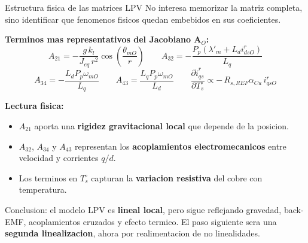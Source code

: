 \documentclass[aspectratio=169,t]{beamer}
\begin{document}
\begin{frame}{Estructura fisica de las matrices LPV}
{\small\color{uncGray}No interesa memorizar la matriz completa, sino identificar que fenomenos fisicos quedan embebidos en sus coeficientes.}\par
\vspace{3mm}

\textbf{Terminos mas representativos del Jacobiano $\bm{A}_O$:}
\begin{equation*}
A_{21}=-\frac{g\,k_l}{J_{eq}\,r^2}\cos\!\left(\frac{\theta_{mO}}{r}\right)
\qquad
A_{32}=-\frac{P_p(\lambda'_m+L_d i_{dsO}^{r})}{L_q}
\end{equation*}
\begin{equation*}
A_{34}=-\frac{L_d P_p \omega_{mO}}{L_q}
\qquad
A_{43}=\frac{L_q P_p \omega_{mO}}{L_d}
\qquad
\frac{\partial \dot{i}_{qs}^{r}}{\partial T_s^\circ}\propto -\,R_{s,REF}\alpha_{Cu}\,i_{qsO}^{r}
\end{equation*}

\textbf{Lectura fisica:}
\begin{itemize}
  \item $A_{21}$ aporta una \textbf{rigidez gravitacional local} que depende de la posicion.
  \item $A_{32}$, $A_{34}$ y $A_{43}$ representan los \textbf{acoplamientos electromecanicos} entre velocidad y corrientes $q/d$.
  \item Los terminos en $T_s^\circ$ capturan la \textbf{variacion resistiva} del cobre con temperatura.
\end{itemize}

{\small Conclusion: el modelo LPV es \textbf{lineal local}, pero sigue reflejando gravedad, back-EMF, acoplamientos cruzados y efecto termico. El paso siguiente sera una \textbf{segunda linealizacion}, ahora por realimentacion de no linealidades.}
\end{frame}
\end{document}
